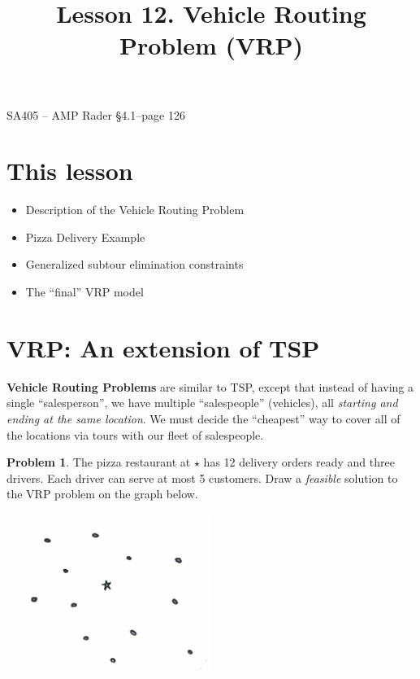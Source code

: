 \documentclass[11pt]{article}
\makeatletter
\theoremstyle{definition}
\newtheorem{problem}{Problem}
\renewcommand{\maketitle}{
  \noindent SA405 -- AMP \hfill Rader \S 4.1--page 126 \\

  \begin{center}\Large{\textbf{\@title}}\end{center}
}
\makeatother
\begin{document}
  
\title{Lesson 12.  Vehicle Routing Problem (VRP)}

\maketitle

\section{This lesson}

\begin{itemize}
	\item  Description of the Vehicle Routing Problem
	\item  Pizza Delivery Example
	\item  Generalized subtour elimination constraints
	\item  The ``final'' VRP model
\end{itemize}

\section{VRP:  An extension of TSP}

\textbf{Vehicle Routing Problems} are similar to TSP, except that instead of having a single ``salesperson'', we have multiple ``salespeople'' (vehicles), all \emph{starting and ending at the same location}.  We must decide the ``cheapest'' way to cover all of the locations via tours with our fleet of salespeople.

\begin{problem} The pizza restaurant at {\huge ${\star}$} has 12 delivery orders ready and three drivers.  Each driver can serve at most 5 customers.  Draw a \emph{feasible} solution to the VRP problem on the graph below.

\vspace{-.5cm}
\begin{center}
\includegraphics[width=0.5\textwidth]{pizza}
\end{center}
\end{problem}
\end{document}
